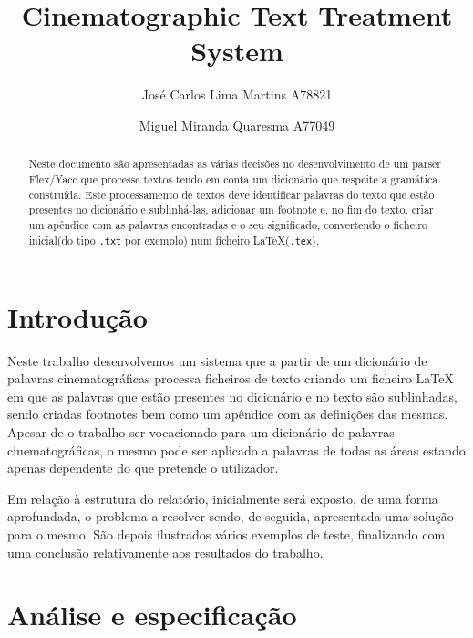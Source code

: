 \documentclass{llncs}
\begin{document}
 \mainmatter
\title{Cinematographic Text Treatment System}
\author{José Carlos Lima Martins A78821 \and
        Miguel Miranda Quaresma A77049}

\maketitle

\justify

\begin{abstract}
    Neste documento são apresentadas as várias decisões  no desenvolvimento de um parser Flex/Yacc que processe textos tendo em conta um dicionário que respeite a gramática construída. Este processamento de textos deve identificar palavras do texto que estão presentes no dicionário e sublinhá-las, adicionar um footnote e, no fim do texto, criar um apêndice com as palavras encontradas e o seu significado, convertendo o ficheiro inicial(do tipo \verb|.txt| por exemplo) num ficheiro \LaTeX(\verb|.tex|).
\end{abstract}

\section{Introdução}
Neste trabalho desenvolvemos um sistema que a partir de um dicionário de palavras cinematográficas processa ficheiros de texto criando um ficheiro \LaTeX{} em que as palavras que estão presentes no dicionário e no texto são sublinhadas, sendo criadas footnotes bem como um apêndice com as definições das mesmas. Apesar de o trabalho ser vocacionado para um dicionário de palavras cinematográficas, o mesmo pode ser aplicado a palavras de todas as áreas estando apenas dependente do que pretende o utilizador.

Em relação à estrutura do relatório, inicialmente será exposto, de uma forma aprofundada, o problema a resolver sendo, de seguida, apresentada uma solução para o mesmo. São depois ilustrados vários exemplos de teste, finalizando com uma conclusão relativamente aos resultados do trabalho.

\section{Análise e especificação}
\end{document}
